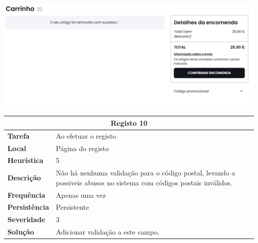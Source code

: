 \documentclass[a4paper,12pt]{article}
\begin{document}
\begin{center}
    \vspace{0.5cm}
    \includegraphics[width=\textwidth, keepaspectratio]{heuristics/07confirmacao_carrinho.png}

    \newpage
    \begin{table}[h!]
        \centering
        \begin{tabular}{|m{3cm}|m{12cm}|}
        \hline
        \multicolumn{2}{|c|}{\textbf{Registo 10}} \\ \hline
        \textbf{Tarefa}       & Ao efetuar o registo \\ \hline
        \textbf{Local}        & Página do registo \\ \hline
        \textbf{Heurística}   & 5  \\ \hline
        \textbf{Descrição}    & Não há nenhuma validação para o código postal, levando a possiveis abusos no sistema com códigos postais inválidos. \\ \hline
        \textbf{Frequência}   & Apenas uma vez \\ \hline
        \textbf{Persistência} & Persistente \\ \hline
        \textbf{Severidade}   & 3 \\ \hline
        \textbf{Solução}      & Adicionar validação a este campo. \\ \hline
        \end{tabular}
    \end{table}


\end{center}
\end{document}
